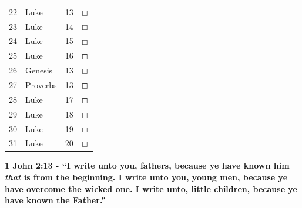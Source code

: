 \documentclass[11pt,landscape,twocolumn,letterpaper]{article}
\begin{document}
\begin{tabular}{p{0.5in}p{1.6in}p{1.3in}p{0.35in}}

  \textcolor[rgb]{0.00,0.00,1.00}{22} & \textcolor[rgb]{0.00,0.00,1.00}{Luke} & 13 & \textcolor[rgb]{0.00,0.00,1.00}{$\boxempty$}\\

  \textcolor[rgb]{0.00,0.00,1.00}{23} & \textcolor[rgb]{0.00,0.00,1.00}{Luke} & 14 & \textcolor[rgb]{0.00,0.00,1.00}{$\boxempty$}\\

  \textcolor[rgb]{0.00,0.00,1.00}{24} & \textcolor[rgb]{0.00,0.00,1.00}{Luke} & 15 & \textcolor[rgb]{0.00,0.00,1.00}{$\boxempty$}\\

  \textcolor[rgb]{0.00,0.00,1.00}{25} & \textcolor[rgb]{0.00,0.00,1.00}{Luke} & 16 & \textcolor[rgb]{0.00,0.00,1.00}{$\boxempty$}\\

  \textcolor[rgb]{0.00,0.00,1.00}{26} & \textcolor[rgb]{0.00,0.00,1.00}{\textcolor[rgb]{0.98,0.00,0.00}{Genesis}} & \textcolor[rgb]{0.98,0.00,0.00}{13} & \textcolor[rgb]{0.00,0.00,1.00}{$\boxempty$}\\

  \textcolor[rgb]{0.00,0.00,1.00}{27} & \textcolor[rgb]{0.00,0.00,1.00}{\textcolor[rgb]{0.98,0.00,0.00}{Proverbs}} & \textcolor[rgb]{0.98,0.00,0.00}{13} & \textcolor[rgb]{0.00,0.00,1.00}{$\boxempty$}\\
  

  \textcolor[rgb]{0.00,0.00,1.00}{28} & \textcolor[rgb]{0.00,0.00,1.00}{Luke} & 17 & \textcolor[rgb]{0.00,0.00,1.00}{$\boxempty$}\\


  \textcolor[rgb]{0.00,0.00,1.00}{29} & \textcolor[rgb]{0.00,0.00,1.00}{Luke} & 18 & \textcolor[rgb]{0.00,0.00,1.00}{$\boxempty$}\\


  \textcolor[rgb]{0.00,0.00,1.00}{30} & \textcolor[rgb]{0.00,0.00,1.00}{Luke} & 19 & \textcolor[rgb]{0.00,0.00,1.00}{$\boxempty$}\\


  \textcolor[rgb]{0.00,0.00,1.00}{31} & \textcolor[rgb]{0.00,0.00,1.00}{Luke} & 20 & \textcolor[rgb]{0.00,0.00,1.00}{$\boxempty$}\\

\end{tabular}


\begin{center}
\textcolor[rgb]{0.00,0.00,1.00}{\textbf{1 John 2:13 - ``I write unto you, fathers, because ye have known him \emph{that} is from the beginning.  I write unto you, young men, because ye have overcome the wicked one.  I write unto, little children, because ye have known the Father.''}}
\end{center}
\end{document}
